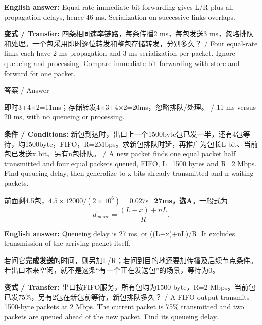 \textbf{English answer:} Equal-rate immediate bit forwarding gives L/R plus all propagation delays, hence 46 ms. Serialization on successive links overlaps.


\textbf{变式 / Transfer:} 四条相同速率链路，每条传播2 ms，每包发送3 ms，忽略排队和处理。一个包采用即时逐位转发和整包存储转发，分别多久？ / Four equal-rate links each have 2-ms propagation and 3-ms serialization per packet. Ignore queueing and processing. Compare immediate bit forwarding with store-and-forward for one packet.



\begin{StudySolution}{答案 / Answer}


即时3+4\ensuremath{\times}2=11ms；存储转发4\ensuremath{\times}3+4\ensuremath{\times}2=20ms，忽略排队/处理。 / 11 ms versus 20 ms, with no queueing or processing.


\end{StudySolution}








\textbf{条件 / Conditions:} 新包到达时，出口上一个1500byte包已发一半，还有4包等待，均1500byte，FIFO，R=2Mbps。求新包排队时延，再推广为包长L bit、当前包已发送x bit、另有n包排队。 / A new packet finds one equal packet half transmitted and four equal packets queued, FIFO, L=1500 bytes and R=2 Mbps. Find queueing delay, then generalize to x bits already transmitted and n waiting packets.


前面剩4.5包，\(4.5\times12000/(2\times10^6)=0.027\)s=\textbf{27ms，选A}。一般式为
\[
d_{queue}=\frac{(L-x)+nL}R.\tag{T2.2}
\]


\textbf{English answer:} Queueing delay is 27 ms, or ((L\ensuremath{-}x)+nL)/R. It excludes transmission of the arriving packet itself.


若问它\textbf{完成发送}的时间，则另加L/R；若问到目的地还要加传播及后续节点条件。若出口本来空闲，就不是这条“有一个正在发送包”的场景，等待为0。


\textbf{变式 / Transfer:} 出口按FIFO服务，所有包均为1500 byte，R=2 Mbps。当前包已发75\%，另有2包在新包前等待，新包排队多久？ / A FIFO output transmits 1500-byte packets at 2 Mbps. The current packet is 75\% transmitted and two packets are queued ahead of the new packet. Find its queueing delay.



